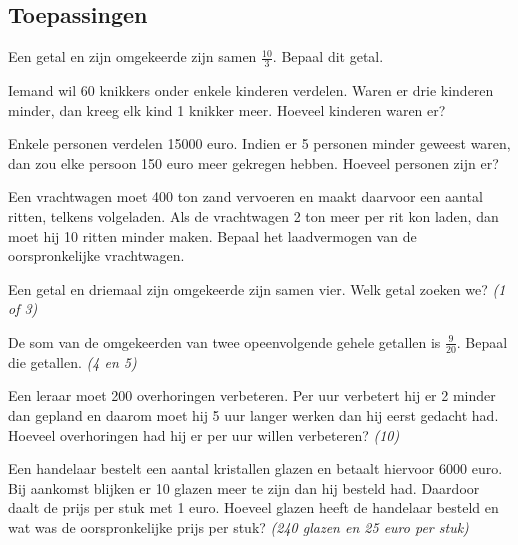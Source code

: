 \documentclass[12pt,twoside,a4paper]{article}
\begin{document}
\subsection{Toepassingen}

\begin{oefening}
Een getal en zijn omgekeerde zijn samen $\frac{10}{3}$. Bepaal dit getal.
\end{oefening}

\begin{oefening}
Iemand wil 60 knikkers onder enkele kinderen verdelen. Waren er drie kinderen minder, dan kreeg elk kind 1 knikker meer. Hoeveel kinderen waren er?
\end{oefening}

\begin{oefening}
Enkele personen verdelen 15000 euro. Indien er 5 personen minder geweest waren, dan zou elke persoon 150 euro meer gekregen hebben. Hoeveel personen zijn er?
\end{oefening}

\begin{oefening}
Een vrachtwagen moet 400 ton zand vervoeren en maakt daarvoor een aantal ritten, telkens volgeladen. Als de vrachtwagen 2 ton meer per rit kon laden, dan moet hij 10 ritten minder maken. Bepaal het laadvermogen van de oorspronkelijke vrachtwagen.
\end{oefening}

\begin{oefening}
Een getal en driemaal zijn omgekeerde zijn samen vier. Welk getal zoeken we? \hfill {\em (1 of 3)}
\end{oefening}

\begin{oefening}
De som van de omgekeerden van twee opeenvolgende gehele getallen is $\frac{9}{20}$. Bepaal die getallen. \hfill {\em (4 en 5)}
\end{oefening}

\begin{oefening}
Een leraar moet 200 overhoringen verbeteren. Per uur verbetert hij er 2 minder dan gepland en daarom moet hij 5 uur langer werken dan hij eerst gedacht had. Hoeveel overhoringen had hij er per uur willen verbeteren? \hfill {\em (10)}
\end{oefening}

\begin{oefening}
Een handelaar bestelt een aantal kristallen glazen en betaalt hiervoor 6000 euro. Bij aankomst blijken er 10 glazen meer te zijn dan hij besteld had. Daardoor daalt de prijs per stuk met 1 euro. Hoeveel glazen heeft de handelaar besteld en wat was de oorspronkelijke prijs per stuk? \hfill {\em (240 glazen en 25 euro per stuk)}
\end{oefening}
\end{document}
